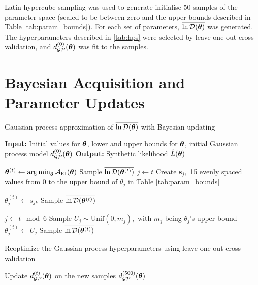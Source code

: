 Latin hypercube sampling was used to generate initialise 50 samples of the
parameter space (scaled to be between zero and the upper bounds described in
Table \ref{tab:param_bounds}). For each set of parameters,
$\overline{\ln\mathcal{D}(\bm{\theta})}$ was generated. The hyper\-parameters described in \ref{tab:hps}
were selected by leave one out cross validation, and $d_{\mathcal{GP}}^{(0)}(\bm{\theta})$ was
fit to the samples.

\section{Bayesian Acquisition and Parameter Updates}

\begin{algorithm}
    \caption{
        Gaussian process approximation of $\overline{\ln\mathcal{D}(\bm{\theta})}$ with Bayesian updating
    }
    \label{alg:GP_reg}
    \begin{algorithmic}
        \State \textbf{Input:} Initial values for $\bm{\theta}$,
        lower and upper bounds for $\bm{\theta}$,
        initial Gaussian process model $d_{\mathcal{GP}}^{(0)}(\bm{\theta})$
        \State \textbf{Output:} Synthetic likelihood $\hat{L}(\bm{\theta})$

        \State
        $\bm{\theta}^{(t)} \gets \operatorname*{arg\,min}_{\bm{\theta}} \mathcal{A}_{\mathrm{EI}}(\bm{\theta})$
        \State Sample $\overline{\ln\mathcal{D}(\bm{\theta}^{(t)})}$
         
        \State $j \gets t$
        \State Create $\mathbf{s}_j,$ 15 evenly spaced values
        from 0 to the upper bound of $\theta_j$ in
        Table \ref{tab:param_bounds}

        \State $\theta^{(t)}_j \gets s_{jk}$
        \State Sample $\overline{\ln\mathcal{D}(\bm{\theta}^{(t)})}$
        \EndFor

        \Else
        \State $j\gets t\mod 6$ 
        \State Sample $U_j\sim \mathrm{Unif}(0, m_j),$ with $m_j$
        being $\theta_j$'s upper bound
        \State $\theta^{(t)}_j \gets U_j$
        \State Sample $\overline{\ln\mathcal{D}(\bm{\theta}^{(t)})}$
        \EndFor
        \EndIf

         
        \State Reoptimize the Gaussian process hyperparameters using
        leave-one-out cross validation
        \EndIf

        \State Update $d_{\mathcal{GP}}^{(t)}(\bm{\theta})$ on the new samples
        \EndFor
        \State \Return $d_{\mathcal{GP}}^{(500)}(\bm{\theta})$
    \end{algorithmic}
\end{algorithm}

